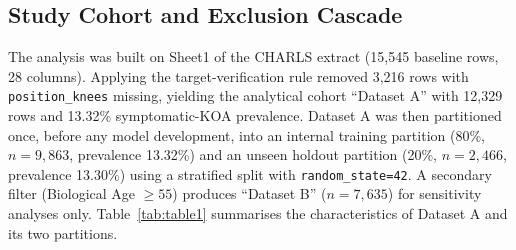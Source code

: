 \documentclass[11pt,a4paper]{article}
\begin{document}
\subsection{Study Cohort and Exclusion Cascade}
The analysis was built on Sheet1 of the CHARLS extract (15{,}545 baseline rows, 28 columns). Applying the target-verification rule removed 3{,}216 rows with \texttt{position\_knees} missing, yielding the analytical cohort ``Dataset A'' with 12{,}329 rows and 13.32\% symptomatic-KOA prevalence. Dataset A was then partitioned once, before any model development, into an internal training partition (80\%, $n=9{,}863$, prevalence 13.32\%) and an unseen holdout partition (20\%, $n=2{,}466$, prevalence 13.30\%) using a stratified split with \texttt{random\_state=42}. A secondary filter (Biological Age $\geq 55$) produces ``Dataset B'' ($n=7{,}635$) for sensitivity analyses only. Table~\ref{tab:table1} summarises the characteristics of Dataset A and its two partitions.
\end{document}
